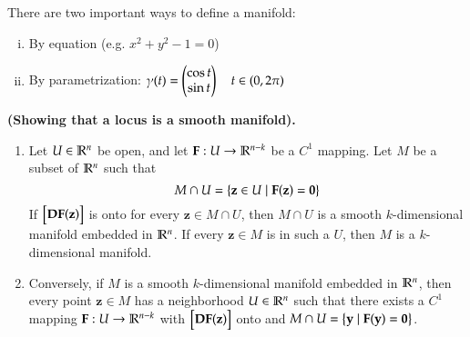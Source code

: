 There are two important ways to define a manifold:
\begin{enumerate}[(i)]
  \item By equation (e.g. $x^2 + y^2 -1 = 0$)
  \item By parametrization: $\displaystyle \gamma (t)=\begin{pmatrix} \cos t \\ \sin t \end{pmatrix}\quad t\in (0,2\pi)$
\end{enumerate}

\begin{theorem}
  \textbf{(Showing that a locus is a smooth manifold).} \begin{enumerate}
 \item Let $U\in \mathbb{R}^n$ be open, and let $\textbf{F}:U\to \mathbb{R}^{n-k}$ be a $C^1$ mapping. Let $M$ be a subset of $\mathbb{R}^n$ such that
 \begin{equation}
 	M\cap U = \left\{ \textbf{z}\in U \mid \textbf{F}(\textbf{z})=\textbf{0} \right\}
 \end{equation}
 If $\begin{bmatrix} \textbf{DF}(\textbf{z}) \end{bmatrix}$ is onto for every $\bm{z}\in M\cap U$, then $M\cap U$ is a smooth $k$-dimensional manifold embedded in $\mathbb{R}^n$. If every $\bm{z}\in M$ is in such a $U$, then $M$ is a $k$-dimensional manifold. 
 
 \item Conversely, if $M$ is a smooth $k$-dimensional manifold embedded in $\mathbb{R}^n$, then every point $\bm{z}\in M$ has a neighborhood $U\in \mathbb{R}^n$ such that there exists a $C^1$ mapping $\textbf{F}:U\to \mathbb{R}^{n-k}$ with $\begin{bmatrix} \textbf{DF}(\textbf{z}) \end{bmatrix}$ onto and $M \cap U = \left\{ \textbf{y} \mid \textbf{F}(\textbf{y}) = \textbf{0} \right\}$. 
 \end{enumerate}

\end{theorem}
